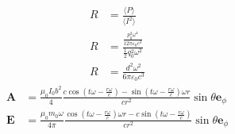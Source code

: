 \begin{align*}
    R&=\frac{\langle P\rangle}{\langle I^2\rangle}\\
    R&=\frac{\frac{p_0^2\omega^4}{12\pi\varepsilon_0c^3}}{\frac{1}{2}q_0^2\omega^2}\\
    R&=\frac{d^2\omega^2}{6\pi\varepsilon_0c^3}
\end{align*}
\begin{align*}
    \boldsymbol{A}&=\frac{\mu_0I_0b^2}{4}\frac{
    c\cos\left(t\omega-\frac{r\omega}{c}\right)-\sin\left(t\omega-\frac{r\omega}{c}\right)\omega r}{cr^2}\sin\theta\boldsymbol{e}_\phi\\
    \boldsymbol{E}&=\frac{\mu_0m_0\omega}{4\pi}\frac{
    \cos\left(t\omega-\frac{r\omega}{c}\right)\omega r-c\sin\left(t\omega-\frac{r\omega}{c}\right)}{cr^2}\sin\theta\boldsymbol{e}_\phi
    \end{align*}
